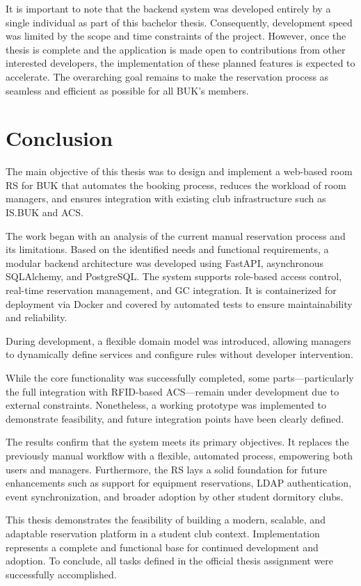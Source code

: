 It is important to note that the backend system was developed entirely by a single individual as part of this bachelor thesis. Consequently, development speed was limited by the scope and time constraints of the project. However, once the thesis is complete and the application is made open to contributions from other interested developers, the implementation of these planned features is expected to accelerate. The overarching goal remains to make the reservation process as seamless and efficient as possible for all BUK's members.

\chapter*{Conclusion}

The main objective of this thesis was to design and implement a web-based room RS for BUK that automates the booking process, reduces the workload of room managers, and ensures integration with existing club infrastructure such as IS.BUK and ACS.

The work began with an analysis of the current manual reservation process and its limitations. Based on the identified needs and functional requirements, a modular backend architecture was developed using FastAPI, asynchronous SQLAlchemy, and PostgreSQL. The system supports role-based access control, real-time reservation management, and GC integration. It is containerized for deployment via Docker and covered by automated tests to ensure maintainability and reliability.

During development, a flexible domain model was introduced, allowing managers to dynamically define services and configure rules without developer intervention.

While the core functionality was successfully completed, some parts—particularly the full integration with RFID-based ACS—remain under development due to external constraints. Nonetheless, a working prototype was implemented to demonstrate feasibility, and future integration points have been clearly defined.

The results confirm that the system meets its primary objectives. It replaces the previously manual workflow with a flexible, automated process, empowering both users and managers. Furthermore, the RS lays a solid foundation for future enhancements such as support for equipment reservations, LDAP authentication, event synchronization, and broader adoption by other student dormitory clubs.

This thesis demonstrates the feasibility of building a modern, scalable, and adaptable reservation platform in a student club context. Implementation represents a complete and functional base for continued development and adoption. To conclude, all tasks defined in the official thesis assignment were successfully accomplished.